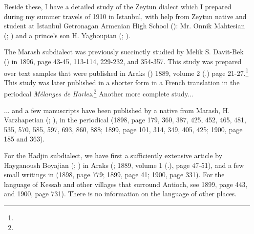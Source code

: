 Beside these, I have a detailed study of the Zeytun dialect which I prepared during my summer travels of 1910 in Istanbul, with help from Zeytun native and student at Istanbul Getronagan Armenian High School (): Mr. Onnik Mahtesian (; ) and a prince's son H. Yaghoupian (; ). 




The Marash subdialect was previously succinctly studied by Melik S. Davit-Bek () in  1896, page 43-45, 113-114, 229-232, and 354-357. This study was prepared over text samples that were published in Araks () 1889, volume 2 (.) page 21-27.\footnote{} This study was later published in a shorter form in a French translation in the periodcal \textit{Mélanges de Harlez}.\footnote{} Another more complete study... 

\begin{adjarianpage}\label{page:200}\end{adjarianpage}%

... and a few manuscripts have been published by a native from Marash, H. Varzhapetian (; ), in the periodical  (1898, page 179, 360, 387, 425, 452, 465, 481, 535, 570, 585, 597, 693, 860, 888; 1899, page 101, 314, 349, 405, 425; 1900, page 185 and 363). 

For the Hadjin subdialect, we have first a sufficiently extensive article by Hayganoush Boyajian (; ) in Araks (; 1889, volume 1 (.), page 47-51), and a few small writings in  (1898, page 779; 1899, page 41; 1900, page 331). For the language of Kessab and other villages that surround Antioch, see  1899, page 443, and 1900, page 731). There is no information on the language of other places. 

